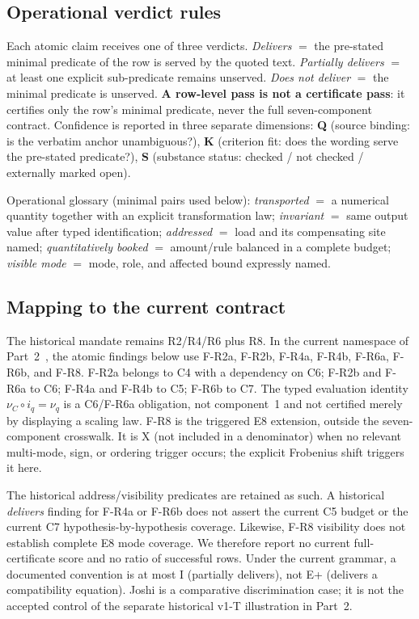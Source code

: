 \documentclass[11pt,a4paper]{article}
\begin{document}
\subsection{Operational verdict rules}\label{sec:rules}

Each atomic claim receives one of three verdicts. \emph{Delivers} $=$ the
pre-stated minimal predicate of the row is served by the quoted text.
\emph{Partially delivers} $=$ at least one explicit sub-predicate remains
unserved. \emph{Does not deliver} $=$ the minimal predicate is unserved.
\textbf{A row-level pass is not a certificate pass}: it certifies only the
row's minimal predicate, never the full seven-component contract. Confidence
is reported in three separate dimensions: \textbf{Q} (source binding: is the
verbatim anchor unambiguous?), \textbf{K} (criterion fit: does the wording
serve the pre-stated predicate?), \textbf{S} (substance status: checked /
not checked / externally marked open).

Operational glossary (minimal pairs used below):
\emph{transported} $=$ a numerical quantity together with an explicit
transformation law; \emph{invariant} $=$ same output value after typed
identification; \emph{addressed} $=$ load and its compensating site named;
\emph{quantitatively booked} $=$ amount/rule balanced in a complete budget;
\emph{visible mode} $=$ mode, role, and affected bound expressly named.

\subsection{Mapping to the current contract}\label{sec:crosswalk}

The historical mandate remains R2/R4/R6 plus R8. In the current
namespace of Part~2~\cite{part2}, the atomic findings below use
F-R2a, F-R2b, F-R4a, F-R4b, F-R6a, F-R6b, and F-R8.
F-R2a belongs to C4 with a dependency on C6; F-R2b and F-R6a to C6;
F-R4a and F-R4b to C5; F-R6b to C7. The typed evaluation identity
$\nu_C\circ i_q=\nu_q$ is a C6/F-R6a obligation, not component~1
and not certified merely by displaying a scaling law.
F-R8 is the triggered E8 extension, outside the seven-component
crosswalk. It is X (not included in a denominator) when no relevant
multi-mode, sign, or ordering trigger occurs; the explicit Frobenius
shift triggers it here.

The historical address/visibility predicates are retained as such.
A historical \emph{delivers} finding for F-R4a or F-R6b does not assert
the current C5 budget or the current C7 hypothesis-by-hypothesis
coverage. Likewise, F-R8 visibility does not establish complete
E8 mode coverage. We therefore report no current full-certificate
score and no ratio of successful rows. Under the current grammar,
a documented convention is at most I (partially delivers), not
E+ (delivers a compatibility equation). Joshi is a comparative
discrimination case; it is not the accepted control of the
separate historical v1-T illustration in Part~2.
\end{document}

